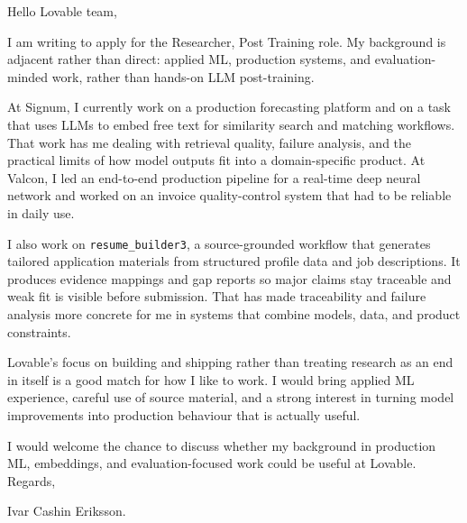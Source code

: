 \documentclass[11pt,a4paper]{moderncv}
\begin{document}
\makecvtitle
Hello Lovable team,

\vspace*{2em}
I am writing to apply for the Researcher, Post Training role. My background is adjacent rather than direct: applied ML, production systems, and evaluation-minded work, rather than hands-on LLM post-training.

\hspace*{2em}
At Signum, I currently work on a production forecasting platform and on a task that uses LLMs to embed free text for similarity search and matching workflows. That work has me dealing with retrieval quality, failure analysis, and the practical limits of how model outputs fit into a domain-specific product. At Valcon, I led an end-to-end production pipeline for a real-time deep neural network and worked on an invoice quality-control system that had to be reliable in daily use.

\hspace*{2em}
I also work on \texttt{resume\_builder3}, a source-grounded workflow that generates tailored application materials from structured profile data and job descriptions. It produces evidence mappings and gap reports so major claims stay traceable and weak fit is visible before submission. That has made traceability and failure analysis more concrete for me in systems that combine models, data, and product constraints.

\hspace*{2em}
Lovable's focus on building and shipping rather than treating research as an end in itself is a good match for how I like to work. I would bring applied ML experience, careful use of source material, and a strong interest in turning model improvements into production behaviour that is actually useful.

\vspace*{2em}
I would welcome the chance to discuss whether my background in production ML, embeddings, and evaluation-focused work could be useful at Lovable. Regards,

\vspace*{1em}
Ivar Cashin Eriksson.
\end{document}
